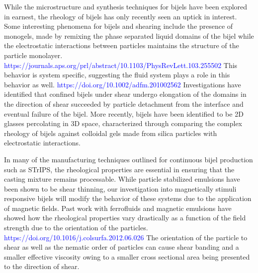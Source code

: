 
While the microstructure and synthesis techniques for bijels have been explored in earnest, the rheology of bijels
has only recently seen an uptick in interest. Some interesting phenomena for bijels and shearing include the 
presence of monogels, made by remixing the phase separated liquid domains of the bijel while the electrostatic
interactions between particles maintains the structure of the particle monolayer. \textcolor{blue}{https://journals.aps.org/prl/abstract/10.1103/PhysRevLett.103.255502}
This behavior is system specific, suggesting the fluid system plays a role in this behavior as well. \textcolor{blue}{https://doi.org/10.1002/adfm.201002562} 
\cite{bai_dynamics_2015} Investigations have identified that confined bijels under shear undergo elongation of
the domains in the direction of shear succeeded by particle detachment from the interface and eventual failure of the bijel. \cite{bonaccorso_shear_2020}
More recently, bijels have been identified to be 2D glasses percolating in 3D space, characterized through comparing the complex rheology of bijels against
colloidal gels made from silica particles with electrostatic interactions. \cite{ching_bijel_2022} 

In many of the manufacturing techniques outlined for continuous bijel production such as STrIPS, the rheological properties are essential in ensuring that 
the casting mixture remains processable. \cite{haase_continuous_2015,haase_situ_2016} While particle stabilized emulsions have been shown to be shear thinning, 
our investigation into magnetically stimuli responsive bijels will modify the behavior of these systems due to the application of magnetic fields. Past work with 
ferrofluids and magnetic emulsions have showed how the rheological properties vary drastically as a function of the field strength due to the orientation of the 
particles. \textcolor{blue}{https://doi.org/10.1016/j.colsurfa.2012.06.026} The orientation of the particle to shear as well as the nematic order of particles 
can cause shear banding and a smaller effective viscosity owing to a smaller cross sectional area being presented to the direction of shear. 

